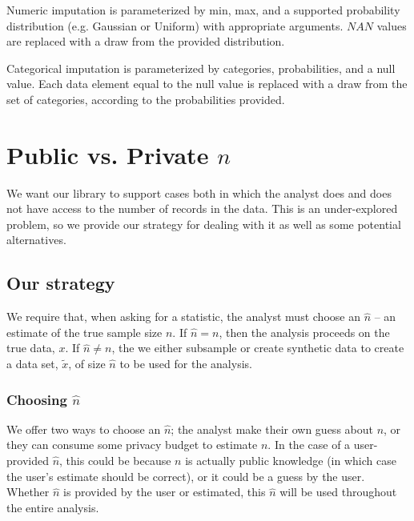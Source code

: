 \documentclass[11pt]{scrartcl} %
\begin{document}
Numeric imputation is parameterized by min, max, and a supported probability distribution (e.g. Gaussian or Uniform)
with appropriate arguments. $NAN$ values are replaced with a draw from the provided distribution. \newline

Categorical imputation is parameterized by categories, probabilities, and a null value.
Each data element equal to the null value is replaced with a draw from the set of categories,
according to the probabilities provided.

\section{Public vs. Private $n$}
We want our library to support cases both in which the analyst does and does not have access to
the number of records in the data. This is an under-explored problem, so we provide
our strategy for dealing with it as well as some potential alternatives.

\subsection{Our strategy}
We require that, when asking for a statistic, the analyst must choose an $\hat{n}$ -- an estimate
of the true sample size $n$. If $\hat{n} = n$, then the analysis proceeds on the
true data, $x$. If $\hat{n} \neq n$, the we either subsample or create synthetic data
to create a data set, $\tilde{x}$, of size $\hat{n}$ to be used for the analysis.

\subsubsection{Choosing $\hat{n}$}
We offer two ways to choose an $\hat{n}$; the analyst make their own guess about $n$, or they can
consume some privacy budget to estimate $n$. In the case of a user-provided $\hat{n}$, this could be because
$n$ is actually public knowledge (in which case the user's estimate should be correct), or it could be
a guess by the user. Whether $\hat{n}$ is provided by the user or estimated, this $\hat{n}$ will be used throughout
the entire analysis. \newline
\end{document}
